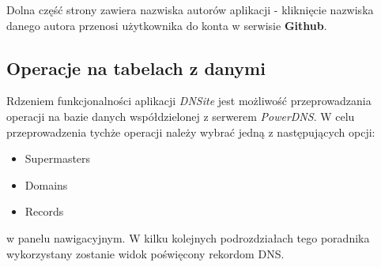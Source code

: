 \documentclass[12pt] {article}
\begin{document}
Dolna część strony zawiera nazwiska autorów aplikacji - kliknięcie nazwiska danego autora przenosi użytkownika do konta w serwisie \textbf{Github}.

\subsection{Operacje na tabelach z danymi}
Rdzeniem funkcjonalności aplikacji \emph{DNSite} jest możliwość przeprowadzania operacji na bazie danych współdzielonej z serwerem \emph{PowerDNS}. W celu przeprowadzenia tychże operacji należy wybrać jedną z następujących opcji:
\begin{itemize}
\item Supermasters
\item Domains
\item Records
\end{itemize}
w panelu nawigacyjnym. W kilku kolejnych podrozdziałach tego poradnika wykorzystany zostanie widok poświęcony rekordom DNS.
\end{document}

